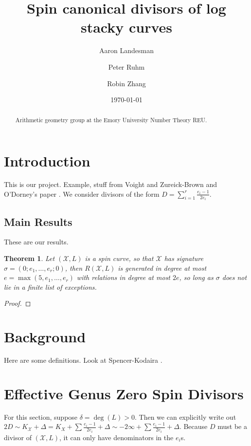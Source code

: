 \documentclass{amsart}
\title{Spin canonical divisors of log stacky curves}
\author{Aaron Landesman}
\author{Peter Ruhm}
\author{Robin Zhang}
\date{\today}
\theoremstyle{plain}
\newtheorem{thm}{Theorem}[section]
\theoremstyle{definition}
\theoremstyle{remark}
\numberwithin{equation}{section}
\newcommand \sx{\mathscr X}
\newcommand \halfcan{L}
\newcommand \subhalf[1]{\frac{e_{#1} - 1}{2e_{#1}}}
\begin{document}
\begin{abstract}
  Arithmetic geometry group at the Emory University Number Theory
	REU.
\end{abstract}

\maketitle

\tableofcontents

\section{Introduction}
This is our project.
Example, stuff from Voight and Zureick-Brown \cite{vzb:stacky}
and O'Dorney's paper \cite{dorney:canonical}.
We consider divisors of the form $D = \sum_{i = 1}^{r} \subhalf{i}$.

\subsection{Main Results}
These are our results.
\begin{thm}
\label{thm:g_0_generators_relations}
Let $(\sx,\halfcan)$ is a spin curve, so that $\sx$ has signature
$\sigma = (0;e_1,\ldots, e_r;0)$, then $R(\sx,\halfcan)$ is
generated in degree at most $e = \max(5,e_1,\ldots, e_r)$ with
relations in degree at most $2e$, so long as $\sigma$ does not lie
in a finite list of exceptions. 
\end{thm}

\begin{proof}

\end{proof}


\section{Background}
Here are some definitions.
Look at Spencer-Kodaira \cite{kodaira:complex-manifolds}.


\section{Effective Genus Zero Spin Divisors}
\label{sec:g_0_effective}
For this section, suppose $\delta=\deg(\halfcan)>0$.  Then we can explicitly write out $2D\sim K_\sx+\Delta=K_X+\sum \subhalf{i}+\Delta\sim-2\infty+\sum \subhalf{i}+\Delta$.  Because $D$ must be a divisor of $(\sx,\halfcan)$, it can only have denominators in the $e_i$s.  
\end{document}

